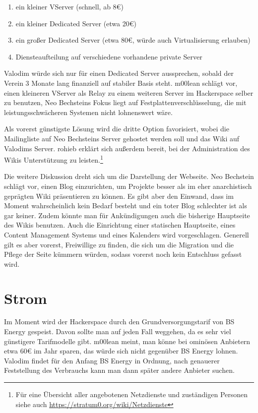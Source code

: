 \documentclass[a4paper,12pt]{scrartcl}
\begin{document}
\begin{enumerate}
	\item ein kleiner VServer (schnell, ab 8€)
	\item ein kleiner Dedicated Server (etwa 20€)
	\item ein großer Dedicated Server (etwa 80€, würde auch Virtualisierung
		erlauben)
	\item Diensteaufteilung auf verschiedene vorhandene private Server
\end{enumerate}

Valodim würde sich nur für einen Dedicated Server aussprechen, sobald der Verein
3 Monate lang finanziell auf stabiler Basis steht. m00lean schlägt vor, einen
kleineren VServer als Relay zu einem weiteren Server im Hackerspace selber zu
benutzen, Neo Bechsteins Fokus liegt auf Festplattenverschlüsselung, die mit
leistungsschwächeren Systemen nicht lohnenswert wäre. 

Als vorerst günstigste Lösung wird die dritte Option favorisiert, wobei die
Mailingliste auf Neo Bechsteins Server gehostet werden soll und das Wiki
auf Valodims Server. rohieb erklärt sich außerdem bereit, bei der Administration
des Wikis Unterstützung zu leisten.\footnote{Für eine Übersicht aller
angebotenen Netzdienste und zuständigen Personen siehe auch
\url{https://stratum0.org/wiki/Netzdienste}}

Die weitere Diskussion dreht sich um die Darstellung der Webseite. Neo Bechstein
schlägt vor, einen Blog einzurichten, um Projekte besser als im eher
anarchistisch geprägten Wiki präsentieren zu können. Es gibt aber den Einwand,
dass im Moment wahrscheinlich kein Bedarf besteht und ein toter Blog schlechter
ist als gar keiner. Zudem könnte man für Ankündigungen auch die bisherige
Hauptseite des Wikis benutzen. Auch die Einrichtung einer statischen Hauptseite,
eines Content Management Systems und eines Kalenders wird vorgeschlagen.
Generell gilt es aber vorerst, Freiwillige zu finden, die sich um die Migration
und die Pflege der Seite kümmern würden, sodass vorerst noch kein Entschluss
gefasst wird.

\section{Strom}
Im Moment wird der Hackerspace durch den Grundversorgungstarif von BS Energy
gespeist. Davon sollte man auf jeden Fall weggehen, da es sehr viel günstigere
Tarifmodelle gibt. m00lean meint, man könne bei ominösen Anbietern etwa 60€ im
Jahr sparen, das würde sich nicht gegenüber BS Energy lohnen. Valodim findet für
den Anfang BS Energy in Ordnung, nach genauerer Feststellung des Verbrauchs kann
man dann später andere Anbieter suchen.
\end{document}
